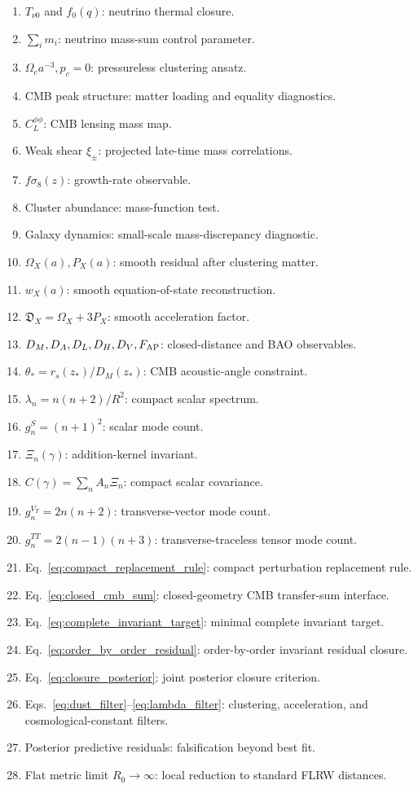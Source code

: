 \documentclass[
  aps,
  prd,
  reprint,
  superscriptaddress,
  nofootinbib,
  floatfix,
  longbibliography
]{revtex4-2}
\theoremstyle{plain}
\theoremstyle{definition}
\theoremstyle{remark}
\newcommand{\Dacc}{\mathfrak D_X}
\begin{document}
\begin{enumerate}
\item $T_{\nu0}$ and $f_0(q)$: neutrino thermal closure.
\item $\sum_i m_i$: neutrino mass-sum control parameter.
\item $\Omega_c a^{-3},p_c=0$: pressureless clustering ansatz.
\item CMB peak structure: matter loading and equality diagnostics.
\item $C_L^{\phi\phi}$: CMB lensing mass map.
\item Weak shear $\xi_\pm$: projected late-time mass correlations.
\item $f\sigma_8(z)$: growth-rate observable.
\item Cluster abundance: mass-function test.
\item Galaxy dynamics: small-scale mass-discrepancy diagnostic.
\item $\Omega_X(a),P_X(a)$: smooth residual after clustering matter.
\item $w_X(a)$: smooth equation-of-state reconstruction.
\item $\Dacc=\Omega_X+3P_X$: smooth acceleration factor.
\item $D_M,D_A,D_L,D_H,D_V,F_{\rm AP}$: closed-distance and BAO observables.
\item $\theta_*=r_s(z_*)/D_M(z_*)$: CMB acoustic-angle constraint.
\item $\lambda_n=n(n+2)/R^2$: compact scalar spectrum.
\item $g_n^S=(n+1)^2$: scalar mode count.
\item $\Xi_n(\gamma)$: addition-kernel invariant.
\item $C(\gamma)=\sum_n A_n\Xi_n$: compact scalar covariance.
\item $g_n^{V_T}=2n(n+2)$: transverse-vector mode count.
\item $g_n^{TT}=2(n-1)(n+3)$: transverse-traceless tensor mode count.
\item Eq.~\eqref{eq:compact_replacement_rule}: compact perturbation replacement rule.
\item Eq.~\eqref{eq:closed_cmb_sum}: closed-geometry CMB transfer-sum interface.
\item Eq.~\eqref{eq:complete_invariant_target}: minimal complete invariant target.
\item Eq.~\eqref{eq:order_by_order_residual}: order-by-order invariant residual closure.
\item Eq.~\eqref{eq:closure_posterior}: joint posterior closure criterion.
\item Eqs.~\eqref{eq:dust_filter}--\eqref{eq:lambda_filter}: clustering, acceleration, and cosmological-constant filters.
\item Posterior predictive residuals: falsification beyond best fit.
\item Flat metric limit $R_0\to\infty$: local reduction to standard FLRW distances.
\end{enumerate}
\end{document}

